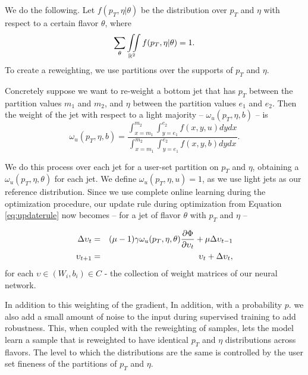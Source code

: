 We do the following. Let $f(p_T,\eta \vert \theta)$ be the distribution over $p_T$ and $\eta$ with respect to a certain flavor $\theta$, where $$\sum_\theta \iint\limits_{\mathbb{R}^2}f(p_T,\eta | \theta) = 1.$$ To create a reweighting, we use partitions over the supports of $p_T$ and $\eta$. 

Concretely suppose we want to re-weight a bottom jet that has $p_T$ between the partition values $m_1$ and $m_2$, and $\eta$ between the partition values $e_1$ and $e_2$. Then the weight of the jet with respect to a light majority -- $\omega_u(p_T, \eta, b)$ -- is 
\begin{equation}
\omega_u(p_T, \eta, b) = \frac{\int_{x = m_1}^{m_2}\int_{y = e_1}^{e_2} f(x,y,u)dydx}{\int_{x = m_1}^{m_2}\int_{y = e_1}^{e_2} f(x,y,b)dydx}.
\end{equation}

We do this process over each jet for a user-set partition on $p_T$ and $\eta$, obtaining a $\omega_u(p_T, \eta, \theta)$ for each jet. We define $\omega_u(p_T, \eta, u) = 1$, as we use light jets as our reference distribution. Since we use complete online learning during the optimization procedure, our update rule during optimization from Equation \eqref{eq:updaterule} now becomes -- for a jet of flavor $\theta$ with $p_T$ and $\eta$ -- 

\begin{eqnarray}
\Delta\upsilon_{t} &=& (\mu - 1)\gamma\omega_u(p_T, \eta, \theta)\frac{\partial \Phi}{\partial \upsilon_t}+ \mu\Delta\upsilon_{t - 1}\\
\upsilon_{t+1} &=& \upsilon_t + \Delta\upsilon_{t},
\end{eqnarray}
for each $\upsilon\in(W_i, {b}_i)\in C$ - the collection of weight matrices of our neural network. 

In addition to this weighting of the gradient, In addition, with a probability $p$. we also add a small amount of noise to the input during supervised training to add robustness. This, when coupled with the reweighting of samples, lets the model learn a sample that is reweighted to have identical $p_T$ and $\eta$ distributions across flavors. The level to which the distributions are the same is controlled by the user set fineness of the partitions of $p_T$ and $\eta$.













